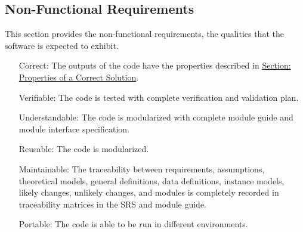 \documentclass[12pt]{article}
\begin{document}
\subsection{Non-Functional Requirements}
\label{Sec:NFRs}
This section provides the non-functional requirements, the qualities that the software is expected to exhibit.
\begin{itemize}
\item[Correct:\phantomsection\label{correct}]The outputs of the code have the properties described in \hyperref[Sec:CorSolProps]{Section: Properties of a Correct Solution}.
\item[Verifiable:\phantomsection\label{verifiable}]The code is tested with complete verification and validation plan.
\item[Understandable:\phantomsection\label{understandable}]The code is modularized with complete module guide and module interface specification.
\item[Reusable:\phantomsection\label{reusable}]The code is modularized.
\item[Maintainable:\phantomsection\label{maintainable}]The traceability between requirements, assumptions, theoretical models, general definitions, data definitions, instance models, likely changes, unlikely changes, and modules is completely recorded in traceability matrices in the SRS and module guide.
\item[Portable:\phantomsection\label{portable}]The code is able to be run in different environments.
\end{itemize}
\end{document}
